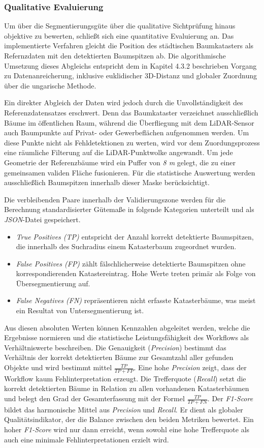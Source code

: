 \subsubsection{Qualitative Evaluierung}

Um über die Segmentierungsgüte über die qualitative Sichtprüfung hinaus objektive zu bewerten, schließt sich eine quantitative Evaluierung an. Das implementierte Verfahren gleicht die Position des städtischen Baumkatasters als Refernzdaten mit den detektierten Baumspitzen ab. Die algorithmische Umsetzung dieses Abgleichs entspricht dem in Kapitel 4.3.2 beschrieben Vorgang zu Datenanreicherung, inklusive euklidischer 3D-Distanz und globaler Zuordnung über die ungarische Methode.

Ein direkter Abgleich der Daten wird jedoch durch die Unvollständigkeit des Referenzdatensatzes erschwert. Denn das Baumkataster verzeichnet ausschließlich Bäume im öffentlichen Raum, während die Überfliegung mit dem LiDAR-Sensor auch Baumpunkte auf Privat- oder Gewerbeflächen aufgenommen werden. Um diese Punkte nicht als Fehldetektionen zu werten, wird vor dem Zuordungsprozess eine räumliche Filterung auf die LiDAR-Punktwolke angewandt. Um jede Geometrie der Referenzbäume wird ein Puffer von \textit{8 m} gelegt, die zu einer gemeinsamen validen Fläche fusionieren. Für die statistische Auswertung werden ausschließlich Baumspitzen innerhalb dieser Maske berücksichtigt.

Die verbleibenden Paare innerhalb der Validierungszone werden für die Berechnung standardisierter Gütemaße in folgende Kategorien unterteilt und als \textit{JSON}-Datei gespeichert.
\begin{itemize}
    \item \textit{True Positives (TP)} entspricht der Anzahl korrekt detektierte Baumspitzen, die innerhalb des Suchradius einem Katasterbaum zugeordnet wurden.
    \item \textit{False Positives (FP)} zählt fälschlicherweise detektierte Baumspitzen ohne korrespondierenden Katastereintrag. Hohe Werte treten primär als Folge von Übersegmentierung auf.
    \item \textit{False Negatives (FN)} repräsentieren nicht erfasste Katasterbäume, was meist ein Resultat von Untersegmentierung ist.
\end{itemize}
Aus diesen absoluten Werten können Kennzahlen abgeleitet werden, welche die Ergebnisse normieren und die statistische Leistungsfähigkeit des Workflows als Verhältniswerte beschreiben. Die Genauigkeit (\textit{Precision}) bestimmt das Verhältnis der korrekt detektierten Bäume zur Gesamtzahl aller gefunden Objekte und wird bestimmt mittel $\frac{TP}{TP + FP}$. Eine hohe \textit{Precision} zeigt, dass der Workflow kaum Fehlinterpretation erzeugt. Die Trefferquote (\textit{Recall}) setzt die korrekt detektierten Bäume in Relation zu allen vorhandenen Katasterbäumen und belegt den Grad der Gesamterfassung mit der Formel $\frac{TP}{TP + FN}$. Der \textit{F1-Score} bildet das harmonische Mittel aus \textit{Precision} und \textit{Recall}. Er dient als globaler Qualitätsindikator, der die Balance zwischen den beiden Metriken bewertet. Ein hoher \textit{F1-Score} wird nur dann erreicht, wenn sowohl eine hohe Trefferquote als auch eine minimale Fehlinterpretationen erzielt wird.
